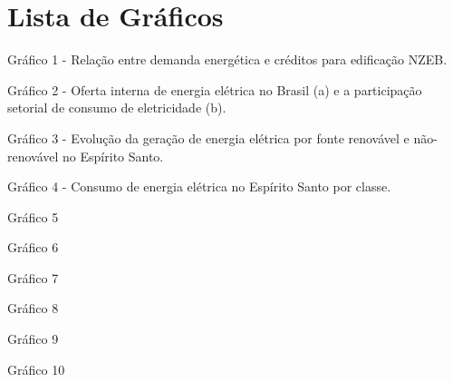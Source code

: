 \section*{Lista de Gráficos}
\vspace*{1.5cm} %
\thispagestyle{empty}
    \begin{onehalfspace}
        \footnotesize
        Gráfico 1 - Relação entre demanda energética e créditos para edificação NZEB.\par
        Gráfico 2 - Oferta interna de energia elétrica no Brasil (a) e a 
        participação setorial de consumo de eletricidade (b).\par
        Gráfico 3 - Evolução da geração de energia elétrica por fonte renovável e não-renovável no Espírito Santo.\par
        Gráfico 4 - Consumo de energia elétrica no Espírito Santo por classe.\par
        Gráfico 5\par
        Gráfico 6\par
        Gráfico 7\par
        Gráfico 8\par
        Gráfico 9\par
        Gráfico 10\par
    \end{onehalfspace}